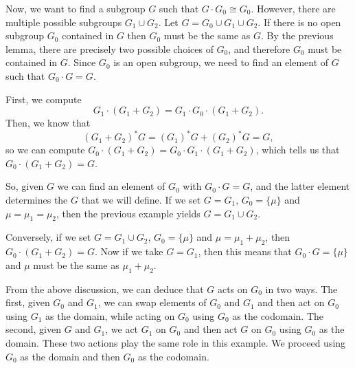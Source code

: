\documentclass[a4paper,reqno,oneside]{article}
\begin{document}
Now, we want to find a subgroup $G$ such that $G \cdot G_0 \cong G_0$. However, there are multiple possible subgroups $G_1 \cup G_2$. Let $G = G_0 \cup G_1 \cup G_2$. If there is no open subgroup $G_0$ contained in $G$ then $G_0$ must be the same as $G$. By the previous lemma, there are precisely two possible choices of $G_0$, and therefore $G_0$ must be contained in $G$. Since $G_0$ is an open subgroup, we need to find an element of $G$ such that $G_0 \cdot G = G$.  

First, we compute
\[
G_1 \cdot (G_1 + G_2) = G_1 \cdot G_0 \cdot (G_1 + G_2).
\] 
Then, we know that
\[
(G_1 + G_2)^*G = (G_1)^*G + (G_2)^*G = G,
\]
so we can compute $G_0 \cdot (G_1 + G_2) = G_0 \cdot G_1 \cdot (G_1 + G_2)$, which tells us that $G_0 \cdot (G_1 + G_2) = G$.

So, given $G$ we can find an element of $G_0$ with $G_0 \cdot G = G$, and the latter element determines the $G$ that we will define.  If we set $G = G_1$, $G_0 = \{\mu\}$ and $\mu = \mu_1 = \mu_2$, then the previous example yields $G = G_1 \cup G_2$. 

Conversely, if we set $G = G_1 \cup G_2$, $G_0 = \{\mu\}$ and $\mu = \mu_1 + \mu_2$, then $G_0 \cdot (G_1 + G_2) = G$.  Now if we take $G = G_1$, then this means that $G_0 \cdot G = \{\mu\}$ and $\mu$ must be the same as $\mu_1 + \mu_2$.

From the above discussion, we can deduce that $G$ acts on $G_0$ in two ways. The first, given $G_0$ and $G_1$, we can swap elements of $G_0$ and $G_1$ and then act on $G_0$ using $G_1$ as the domain, while acting on $G_0$ using $G_0$ as the codomain. The second, given $G$ and $G_1$, we act $G_1$ on $G_0$ and then act $G$ on $G_0$ using $G_0$ as the domain. These two actions play the same role in this example.  We proceed using $G_0$ as the domain and then $G_0$ as the codomain.
\end{document}
